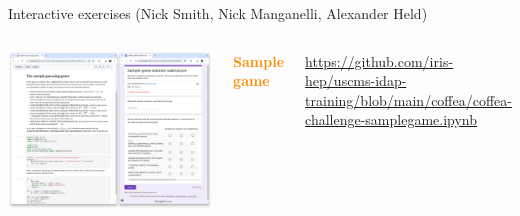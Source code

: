 \documentclass[aspectratio=169]{beamer}
\begin{document}
\begin{frame}{Interactive exercises (Nick Smith, Nick Manganelli, Alexander Held)}
\vspace{0.25 cm}
\large
\begin{columns}
\includegraphics[width=\linewidth]{PLOTS/sample-guessing-game.png}

\textcolor{darkorange}{\bf Sample game}

\tiny
\vspace{0.2 cm}
\textcolor{blue}{\href{https://github.com/iris-hep/uscms-idap-training/blob/main/coffea/coffea-challenge-samplegame.ipynb}{https://github.com/iris-hep/uscms-idap-training/blob/main/coffea/coffea-challenge-samplegame.ipynb}}

\small
\vspace{0.225 cm}

\vspace{0.225 cm}

\vspace{0.225 cm}

\vspace{0.225 cm}
\end{columns}
\end{frame}
\end{document}
